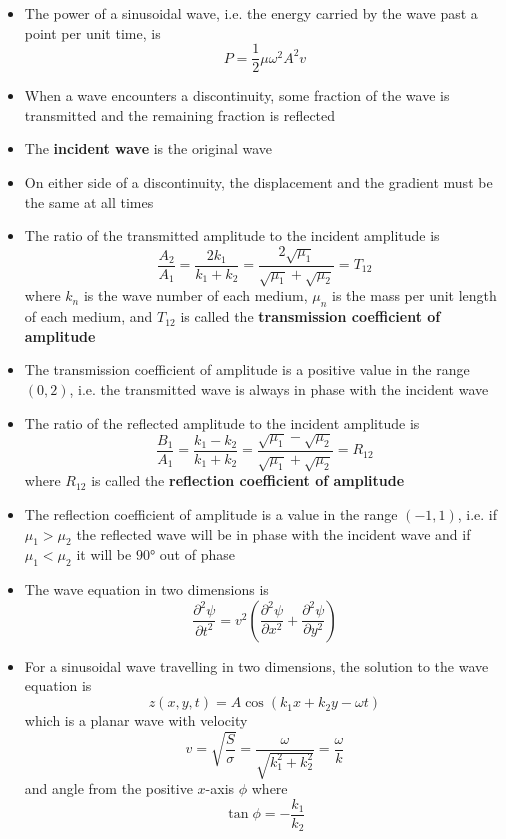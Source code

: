 \documentclass{article}
\begin{document}
\begin{itemize}
  \item The power of a sinusoidal wave, i.e. the energy carried by the wave past a point per unit time, is \[P = \frac{1}{2} \mu \omega^2 A^2 v\]

  \item When a wave encounters a discontinuity, some fraction of the wave is transmitted and the remaining fraction is reflected

  \item The \textbf{incident wave} is the original wave

  \item On either side of a discontinuity, the displacement and the gradient must be the same at all times

\item The ratio of the transmitted amplitude to the incident amplitude is \[\frac{A_2}{A_1} = \frac{2 k_1}{k_1 + k_2} = \frac{2 \sqrt{\mu_1}}{\sqrt{\mu_1} + \sqrt{\mu_2}} = T_{12}\] where $k_n$ is the wave number of each medium, $\mu_n$ is the mass per unit length of each medium, and $T_{12}$ is called the \textbf{transmission coefficient of amplitude}

  \item The transmission coefficient of amplitude is a positive value in the range $(0, 2)$, i.e. the transmitted wave is always in phase with the incident wave

  \item The ratio of the reflected amplitude to the incident amplitude is \[\frac{B_1}{A_1} = \frac{k_1 - k_2}{k_1 + k_2} = \frac{\sqrt{\mu_1} - \sqrt{\mu_2}}{\sqrt{\mu_1} + \sqrt{\mu_2}} = R_{12}\] where $R_{12}$ is called the \textbf{reflection coefficient of amplitude}

  \item The reflection coefficient of amplitude is a value in the range $(-1, 1)$, i.e. if $\mu_1 > \mu_2$ the reflected wave will be in phase with the incident wave and if $\mu_1 < \mu_2$ it will be $\ang{90}$ out of phase

  \item The wave equation in two dimensions is \[\frac{\partial^2 \psi}{\partial t^2} = v^2 \left( \frac{\partial^2 \psi}{\partial x^2} + \frac{\partial^2 \psi}{\partial y^2} \right)\]

\item For a sinusoidal wave travelling in two dimensions, the solution to the wave equation is \[z(x, y, t) = A \cos (k_1 x + k_2 y - \omega t)\] which is a planar wave with velocity \[v = \sqrt{\frac{S}{\sigma}} = \frac{\omega}{\sqrt{k_1^2 + k_2^2}} = \frac{\omega}{k}\] and angle from the positive $x$-axis $\phi$ where \[\tan \phi = -\frac{k_1}{k_2}\]


\end{itemize}
\end{document}
